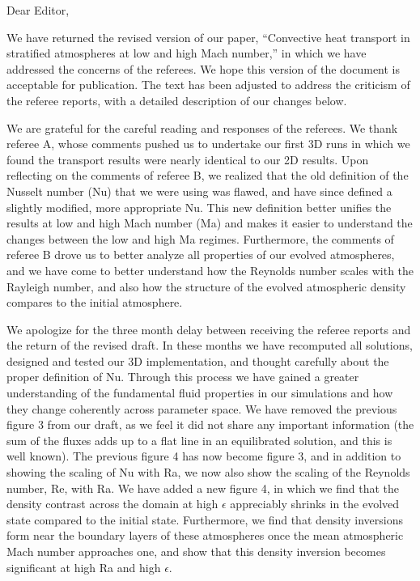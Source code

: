 \documentclass[aps, 11pt, singlecolumn]{revtex4-1} %
\begin{document}
\noindent
Dear Editor,
$\,$\newline

\begin{singlespace}
We have returned the revised version of our paper, 
``Convective heat transport in stratified atmospheres at low and high
Mach number,'' in which we have addressed the concerns of the referees.
We hope this version of the document is acceptable for publication.  The text 
has been adjusted to address the criticism of the referee reports,
with a detailed description of our changes below.

We are grateful for the careful reading and responses of the referees.  
We thank referee A, whose
comments pushed us to undertake our first 3D runs in which we found the
transport results were nearly identical to our 2D results.
Upon reflecting on the
comments of referee B, we realized that the old definition of the
Nusselt number (Nu) that we were using was flawed, and have since defined
a slightly modified, more appropriate Nu.  This new definition better unifies
the results at low and high Mach number (Ma) and makes it easier to understand
the changes between the low and high Ma regimes.  Furthermore, 
the comments of referee B drove us to better analyze all properties of our evolved
atmospheres, and we have come to better understand how the Reynolds number scales with
the Rayleigh number, and also how the structure of the evolved atmospheric density
compares to the initial atmosphere.

We apologize for the three month delay between receiving the referee reports
and the return of the revised draft.  In these months we have
recomputed all solutions, designed and tested our 3D implementation, and
thought carefully about the proper definition of Nu.  Through this
process we have gained a greater understanding of the fundamental
fluid properties in our simulations and how they change coherently
across parameter space.  We have removed the previous figure 3 from our
draft, as we feel it did not share any important information (the sum of
the fluxes adds up to a flat line in an equilibrated solution, and this
is well known).  The previous figure 4 has now become figure 3, and in addition
to showing the scaling of Nu with Ra, we now also show the scaling of the
Reynolds number, Re, with Ra.  We have added a new figure 4, in which we
find that the density contrast across the domain at high $\epsilon$ appreciably
shrinks in the evolved state compared to the initial state.  Furthermore, we
find that density inversions form near the boundary layers of these atmospheres
once the mean atmospheric Mach number approaches one, and show that this density
inversion becomes significant at high Ra and high $\epsilon$.


\end{singlespace}
\end{document}
